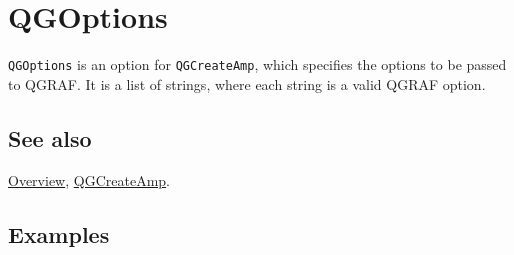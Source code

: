 \documentclass[../FeynHelpersManual.tex]{subfiles}
\begin{document}
\hypertarget{qgoptions}{
\section{QGOptions}\label{qgoptions}}

\texttt{QGOptions} is an option for \texttt{QGCreateAmp}, which
specifies the options to be passed to QGRAF. It is a list of strings,
where each string is a valid QGRAF option.

\subsection{See also}

\hyperlink{toc}{Overview}, \hyperlink{qgcreateamp}{QGCreateAmp}.

\subsection{Examples}
\end{document}
